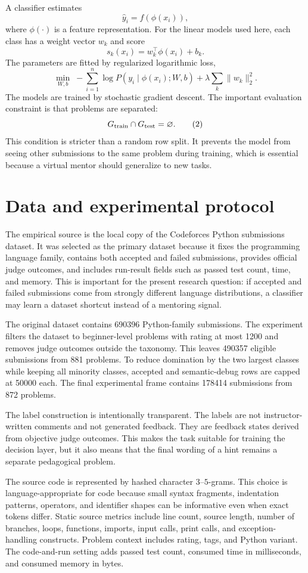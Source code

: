 \documentclass[twoside,11pt]{article}
\begin{document}
A classifier estimates
\[
\hat{y}_i=f(\phi(x_i)),
\]
where $\phi(\cdot)$ is a feature representation. For the linear models used here, each class has a weight vector $w_k$ and score
\[
s_k(x_i)=w_k^\top \phi(x_i)+b_k.
\]
The parameters are fitted by regularized logarithmic loss,
\[
\min_{W,b}\;-\sum_{i=1}^{n}\log P(y_i\mid \phi(x_i);W,b)+
\lambda\sum_{k}\|w_k\|_2^2. \tag{1}
\]
The models are trained by stochastic gradient descent. The important evaluation constraint is that problems are separated:
\[
G_{\rm train}\cap G_{\rm test}=\varnothing . \tag{2}
\]
This condition is stricter than a random row split. It prevents the model from seeing other submissions to the same problem during training, which is essential because a virtual mentor should generalize to new tasks.

\section{\large Data and experimental protocol}

The empirical source is the local copy of the Codeforces Python submissions dataset. It was selected as the primary dataset because it fixes the programming language family, contains both accepted and failed submissions, provides official judge outcomes, and includes run-result fields such as passed test count, time, and memory. This is important for the present research question: if accepted and failed submissions come from strongly different language distributions, a classifier may learn a dataset shortcut instead of a mentoring signal.

The original dataset contains 690396 Python-family submissions. The experiment filters the dataset to beginner-level problems with rating at most 1200 and removes judge outcomes outside the taxonomy. This leaves 490357 eligible submissions from 881 problems. To reduce domination by the two largest classes while keeping all minority classes, accepted and semantic-debug rows are capped at 50000 each. The final experimental frame contains 178414 submissions from 872 problems.

The label construction is intentionally transparent. The labels are not instructor-written comments and not generated feedback. They are feedback states derived from objective judge outcomes. This makes the task suitable for training the decision layer, but it also means that the final wording of a hint remains a separate pedagogical problem.

The source code is represented by hashed character $3$--$5$-grams. This choice is language-appropriate for code because small syntax fragments, indentation patterns, operators, and identifier shapes can be informative even when exact tokens differ. Static source metrics include line count, source length, number of branches, loops, functions, imports, input calls, print calls, and exception-handling constructs. Problem context includes rating, tags, and Python variant. The code-and-run setting adds passed test count, consumed time in milliseconds, and consumed memory in bytes.
\end{document}

